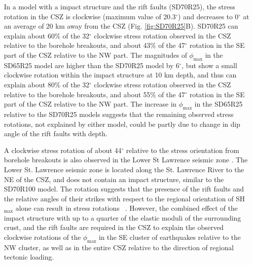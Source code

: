 \documentclass[draft]{agujournal2018}
\begin{document}
In a model with a impact structure and the rift faults (SD70R25), the stress rotation in the CSZ is clockwise (maximum value of 20.3$^\circ$) and decreases to 0$^\circ$ at an average of 20 km away from the CSZ (Fig. \ref{fig:SD70R25}B). SD70R25 can explain about 60$\%$ of the 32$^\circ$ clockwise stress rotation observed in the CSZ relative to the borehole breakouts, and about 43$\%$ of the 47$^\circ$ rotation in the SE part of the CSZ relative to the NW part. The magnitudes of $\phi_{\max}$ in the SD65R25 model are higher than the SD70R25 model by 6$^\circ$, but show a small clockwise rotation within the impact structure at 10 km depth, and thus can explain about 80$\%$ of the 32$^\circ$ clockwise stress rotation observed in the CSZ relative to the borehole breakouts, and about 55$\%$ of the 47$^\circ$ rotation in the SE part of the CSZ relative to the NW part. The increase in $\phi_{\max}$ in the SD65R25 relative to the SD70R25 models suggests that the remaining observed stress rotations, not explained by either model, could be partly due to change in dip angle of the rift faults with depth. 

A clockwise stress rotation of about 44$^\circ$ relative to the stress orientation from borehole breakouts is also observed in the Lower St Lawrence seismic zone \citep{Mazzotti_2010}. The Lower St. Lawrence seismic zone is located along the St. Lawrence River to the NE of the CSZ, and does not contain an impact structure, similar to the SD70R100 model. The rotation suggests that the presence of the rift faults and the relative angles of their strikes with respect to the regional orientation of SH$_{\max}$ alone can result in stress rotations ~\citep[e.g.,][]{Zoback_1992}. However, the combined effect of the impact structure with up to a quarter of the elastic moduli of the surrounding crust, and the rift faults are required in the CSZ to explain the observed clockwise rotations of the $\phi_{\max}$ in the SE cluster of earthquakes relative to the NW cluster, as well as in the entire CSZ relative to the direction of regional tectonic loading.
\end{document}

